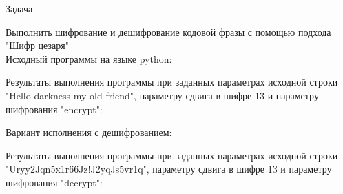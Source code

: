 \begin{center}
    Задача
\end{center}
Выполнить шифрование и дешифрование кодовой фразы с помощью подхода "Шифр цезаря"\\

Исходный программы на языке python:



Результаты выполнения программы при заданных параметрах исходной строки "Hello darkness my old friend", параметру сдвига в шифре 13 и параметру шифрования "encrypt":


\newpage{}

Вариант исполнения с дешифрованием:


Результаты выполнения программы при заданных параметрах исходной строки "Uryy2Jqn5x1r66Jz!J2yqJs5vr1q", параметру сдвига в шифре 13 и параметру шифрования "decrypt":


\newpage{}
